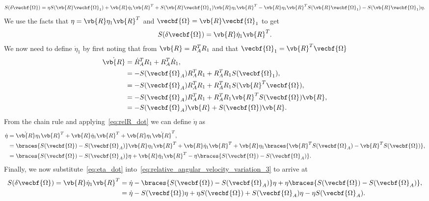 \documentclass[11pt, reqno]{article}    %
\begin{document}
\begin{align}\label{eq:relative_angular_velocity_variation_3}
    S(\delta \vecbf{\Omega}) = \eta S(\vb{R} \vecbf{\Omega}_1) + \vb{R} \dot{\eta}_1 \vb{R}^T + S(\vb{R} \vecbf{\Omega}_1) \vb{R} \eta_1 \vb{R}^T - \vb{R} \eta_1 \vb{R}^T S(\vb{R} \vecbf{\Omega}_1) - S(\vb{R} \vecbf{\Omega}_1) \eta .
\end{align}
We use the facts that \( \eta = \vb{R} \eta_1 \vb{R}^T \) and \( \vecbf{\Omega} = \vb{R} \vecbf{\Omega}_1\) to get
\begin{align}\label{eq:relative_angular_velocity_variation_3}
    S(\delta \vecbf{\Omega}) = \vb{R} \dot{\eta}_1 \vb{R}^T.
\end{align}
We now need to define \( \dot{\eta}_1\) by first noting that from \( \vb{R} = R_A^T R_1\) and that \( \vecbf{\Omega}_1 = \vb{R}^T \vecbf{\Omega}\)
\begin{align}\label{eq:relR_dot}
    \dot{\vb{R}} &= \dot{R}_A^T R_1 + R_A^T \dot{R}_1 , \nonumber\\
    &= - S(\vecbf{\Omega}_A) R_A^T R_1 + R_A^T R_1 S(\vecbf{\Omega}_1) ,\nonumber\\
    &= -S(\vecbf{\Omega}_A) R_A^T R_1 + R_A^T R_1 S(\vb{R}^T \vecbf{\Omega}) , \nonumber\\
    &= -S(\vecbf{\Omega}_A)R_A^T R_1 + R_A^T R_1 \vb{R}^T S(\vecbf{\Omega}) \vb{R} ,\nonumber\\
    &= -S(\vecbf{\Omega}_A)\vb{R} + S(\vecbf{\Omega}) \vb{R} .
\end{align}
From the chain rule and applying~\cref{eq:relR_dot} we can define \( \dot{\eta} \) as
\begin{align}\label{eq:eta_dot}
    \dot{\eta} &= \dot{\vb{R}} \eta_1 \vb{R}^T + \vb{R} \dot{\eta}_1 \vb{R}^T + \vb{R} \eta_1 \dot{\vb{R}}^T , \nonumber\\
    &= \braces{S(\vecbf{\Omega}) - S(\vecbf{\Omega}_A)} \vb{R} \eta_1 \vb{R}^T + \vb{R} \dot{\eta}_1 \vb{R}^T + \vb{R} \eta_1 \braces{\vb{R}^T S(\vecbf{\Omega}_A) - \vb{R}^T S(\vecbf{\Omega})} , \nonumber\\
    &= \braces{S(\vecbf{\Omega}) - S(\vecbf{\Omega}_A)} \eta + \vb{R} \dot{\eta}_1 \vb{R}^T - \eta \braces{S(\vecbf{\Omega}) - S(\vecbf{\Omega}_A)} .
\end{align}
Finally, we now substitute~\cref{eq:eta_dot} into~\cref{eq:relative_angular_velocity_variation_3} to arrive at
\begin{align}\label{eq:rel_ang_vel_var}
    S(\delta \vecbf{\Omega}) = \vb{R} \dot{\eta}_1 \vb{R}^T &= \dot{\eta} - \braces{S(\vecbf{\Omega}) - S(\vecbf{\Omega}_A)} \eta + \eta \braces{S(\vecbf{\Omega}) - S(\vecbf{\Omega}_A)} , \nonumber \\
    &= \dot{\eta} - S(\vecbf{\Omega}) \eta + \eta S(\vecbf{\Omega}) +  S(\vecbf{\Omega}_A) \eta - \eta S(\vecbf{\Omega}_A) .
\end{align}
\end{document}
